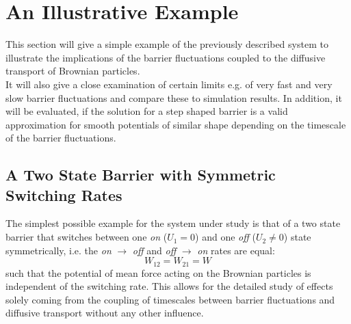 \chapter{An Illustrative Example}
\label{results}
This section will give a simple example of the previously described system to illustrate the implications of the barrier fluctuations coupled to the diffusive transport of Brownian particles.\\
It will also give a close examination of certain limits e.g. of very fast and very slow barrier fluctuations and compare these to simulation results. In addition, it will be evaluated, if the solution for a step shaped barrier is a valid approximation for smooth potentials of similar shape depending on the timescale of the barrier fluctuations. \\
\section*{A Two State Barrier with Symmetric Switching Rates}
The simplest possible example for the system under study is that of a two state barrier that switches between one \emph{on} ($U_1 = 0$) and one \emph{off} ($U_2 \ne 0$) state symmetrically, i.e. the \emph{on} $\rightarrow$ \emph{off} and \emph{off} $\rightarrow$ \emph{on} rates are equal: 
\begin{equation}
    W_{1 2}=W_{2 1}=W
    \label{symmetric_rates}
\end{equation}
such that the potential of mean force acting on the Brownian particles is independent of the switching rate.
This allows for the detailed study of effects solely coming from the coupling of timescales between barrier fluctuations and diffusive transport without any other influence.
